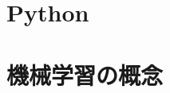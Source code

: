 \documentclass[a4paper,11pt,vartwoside,openany,dvipdfmx]{jsbook}
\begin{document}
\maketitle
\tableofcontents

\chapter{Python}



\chapter{機械学習の概念}




\end{document}
